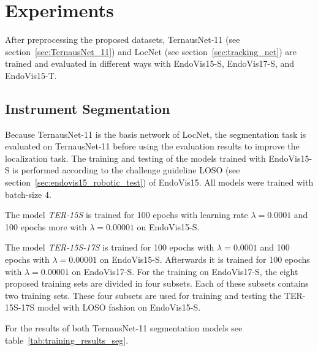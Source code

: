 \section{Experiments}
After preprocessing the proposed datasets, TernausNet-11 (see section~\ref{sec:TernausNet_11}) and LocNet (see section~\ref{sec:tracking_net}) are trained and evaluated in different ways with EndoVis15-S, EndoVis17-S, and EndoVis15-T.

\subsection{Instrument Segmentation}
Because TernausNet-11 is the basis network of LocNet, the segmentation task is evaluated on TernausNet-11 before using the evaluation results to improve the localization task.
The training and testing of the models trained with EndoVis15-S is performed according to the challenge guideline LOSO (see section~\ref{sec:endovis15_robotic_test}) of EndoVis15. All models were trained with batch-size 4.

The model \emph{TER-15S} is trained for 100 epochs with learning rate $\lambda=0.0001$ and 100 epochs more with $\lambda=0.00001$ on EndoVis15-S. 

The model \emph{TER-15S-17S} is trained for 100 epochs with $\lambda=0.0001$ and 100 epochs with $\lambda=0.00001$ on EndoVis15-S.
Afterwards it is trained for 100 epochs with $\lambda=0.00001$ on EndoVis17-S. For the training on EndoVis17-S, the eight proposed training sets are divided in four subsets. Each of these subsets contains two training sets. These four subsets are used for training and testing the TER-15S-17S model with LOSO fashion on EndoVis15-S. 

For the results of both TernausNet-11 segmentation models see table~\ref{tab:training_results_seg}.

